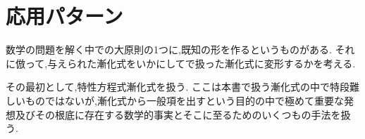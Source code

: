 
\section{応用パターン}\label{節：応用パターン}
  数学の問題を解く中での大原則の1つに,既知の形を作るというものがある.
  それに倣って,与えられた漸化式をいかにしてで扱った漸化式に変形するかを考える.

  その最初として,特性方程式漸化式を扱う.
  ここは本書で扱う漸化式の中で特段難しいものではないが,漸化式から一般項を出すという目的の中で極めて重要な発想及びその根底に存在する数学的事実とそこに至るためのいくつもの手法を扱う.
  
  
  
  
  
  
  
  
